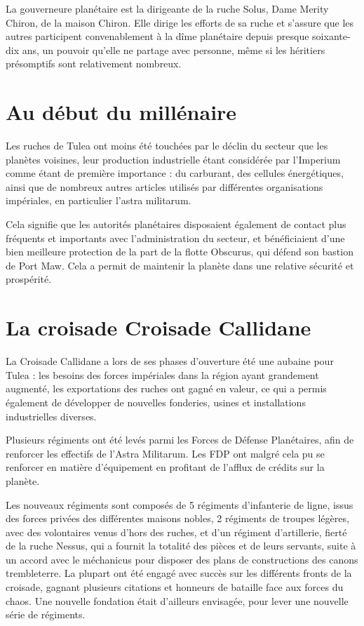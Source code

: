 \documentclass[10pt,a4paper]{book}
\newcommand{\croisade}{Croisade Callidane }
\newcommand{\zone}{Tulea }
\begin{document}
La gouverneure planétaire est la dirigeante de la ruche Solus, Dame Merity Chiron, de la maison Chiron. Elle dirige les efforts de sa ruche et s'assure que les autres participent convenablement à la dîme planétaire depuis presque soixante-dix ans, un pouvoir qu'elle ne partage avec personne, même si les héritiers présomptifs sont relativement nombreux.
\section{Au début du millénaire}
Les ruches de \zone ont moins été touchées par le déclin du secteur que les planètes voisines, leur production industrielle étant considérée par l'Imperium comme étant de première importance : du carburant, des cellules énergétiques, ainsi que de nombreux autres articles utilisés par différentes organisations impériales, en particulier l'astra militarum.

Cela signifie que les autorités planétaires disposaient également de contact plus fréquents et importants avec l'administration du secteur, et bénéficiaient d'une bien meilleure protection de la part de la flotte Obscurus, qui défend son bastion de Port Maw. Cela a permit de maintenir la planète dans une relative sécurité et prospérité. 
\section{La croisade \croisade}
La \croisade a lors de ses phases d'ouverture été une aubaine pour \zone : les besoins des forces impériales dans la région ayant grandement augmenté, les exportations des ruches ont gagné en valeur, ce qui a permis également de développer de nouvelles fonderies, usines et installations industrielles diverses. 

Plusieurs régiments ont été levés parmi les Forces de Défense Planétaires, afin de renforcer les effectifs de l'Astra Militarum. Les FDP ont malgré cela pu se renforcer en matière d'équipement en profitant de l'afflux de crédits sur la planète. 

Les nouveaux régiments sont composés de 5 régiments d'infanterie de ligne, issus des forces privées des différentes maisons nobles, 2 régiments de troupes légères, avec des volontaires venus d'hors des ruches, et d'un régiment d'artillerie, fierté de la ruche Nessus, qui a fournit la totalité des pièces et de leurs servants, suite à un accord avec le méchanicus pour disposer des plans de constructions des canons trembleterre. La plupart ont été engagé avec succès sur les différents fronts de la croisade, gagnant plusieurs citations et honneurs de bataille face aux forces du chaos. Une nouvelle fondation était d'ailleurs envisagée, pour lever une nouvelle série de régiments.
\end{document}
